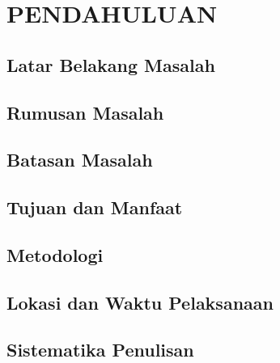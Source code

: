 \chapter{\vspace{2ex}PENDAHULUAN}

\section{Latar Belakang Masalah}


\section{Rumusan Masalah}


\section{Batasan Masalah}


\section{Tujuan dan Manfaat}


\section{Metodologi}


\section{Lokasi dan Waktu Pelaksanaan}


\section{Sistematika Penulisan}
